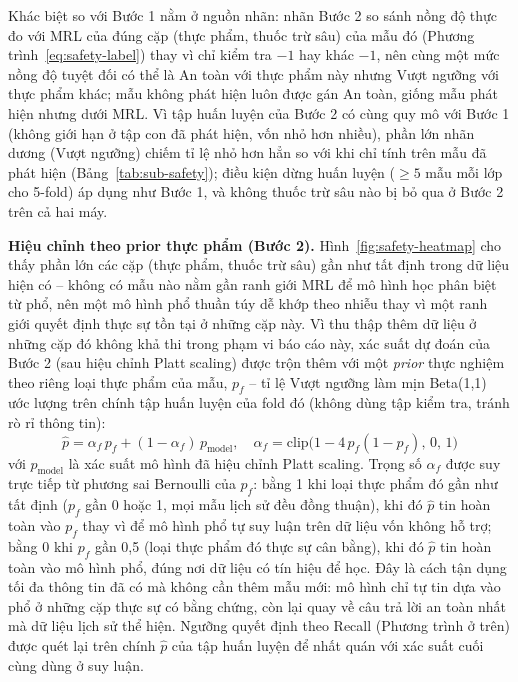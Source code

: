 \documentclass[10pt,twocolumn,twoside]{article}
\begin{document}
Khác biệt so với Bước 1 nằm ở nguồn nhãn: nhãn Bước 2 so sánh nồng độ thực
đo với MRL của đúng cặp (thực phẩm, thuốc trừ sâu) của mẫu đó (Phương
trình~\ref{eq:safety-label}) thay vì chỉ kiểm tra $-1$ hay khác $-1$, nên
cùng một mức nồng độ tuyệt đối có thể là An toàn với thực phẩm này nhưng
Vượt ngưỡng với thực phẩm khác; mẫu không phát hiện luôn được gán An toàn,
giống mẫu phát hiện nhưng dưới MRL. Vì tập huấn luyện của Bước 2 có cùng quy
mô với Bước 1 (không giới hạn ở tập con đã phát hiện, vốn nhỏ hơn nhiều),
phần lớn nhãn dương (Vượt ngưỡng) chiếm tỉ lệ nhỏ hơn hẳn so với khi chỉ
tính trên mẫu đã phát hiện (Bảng~\ref{tab:sub-safety}); điều kiện dừng huấn
luyện ($\geq 5$ mẫu mỗi lớp cho 5-fold) áp dụng như Bước 1, và không thuốc
trừ sâu nào bị bỏ qua ở Bước 2 trên cả hai máy.

\textbf{Hiệu chỉnh theo prior thực phẩm (Bước 2).} Hình~\ref{fig:safety-heatmap}
cho thấy phần lớn các cặp (thực phẩm, thuốc trừ sâu) gần như tất định trong
dữ liệu hiện có -- không có mẫu nào nằm gần ranh giới MRL để mô hình học
phân biệt từ phổ, nên một mô hình phổ thuần túy dễ khớp theo nhiễu thay vì
một ranh giới quyết định thực sự tồn tại ở những cặp này. Vì thu thập thêm
dữ liệu ở những cặp đó không khả thi trong phạm vi báo cáo này, xác suất dự
đoán của Bước 2 (sau hiệu chỉnh Platt scaling) được trộn thêm với một
\emph{prior} thực nghiệm theo riêng loại thực phẩm của mẫu, $p_f$ -- tỉ lệ
Vượt ngưỡng làm mịn Beta(1,1) ước lượng trên chính tập huấn luyện của fold
đó (không dùng tập kiểm tra, tránh rò rỉ thông tin):
\begin{equation}
\hat{p} = \alpha_f\, p_f + (1-\alpha_f)\, p_{\text{model}}, \quad
\alpha_f = \mathrm{clip}\big(1 - 4\,p_f(1-p_f),\, 0,\, 1\big)
\label{eq:food-shrinkage}
\end{equation}
với $p_{\text{model}}$ là xác suất mô hình đã hiệu chỉnh Platt scaling.
Trọng số $\alpha_f$ được suy trực tiếp từ phương sai Bernoulli của $p_f$:
bằng 1 khi loại thực phẩm đó gần như tất định ($p_f$ gần 0 hoặc 1, mọi mẫu
lịch sử đều đồng thuận), khi đó $\hat p$ tin hoàn toàn vào $p_f$ thay vì để
mô hình phổ tự suy luận trên dữ liệu vốn không hỗ trợ; bằng 0 khi $p_f$ gần
0,5 (loại thực phẩm đó thực sự cân bằng), khi đó $\hat p$ tin hoàn toàn vào
mô hình phổ, đúng nơi dữ liệu có tín hiệu để học. Đây là cách tận dụng tối
đa thông tin đã có mà không cần thêm mẫu mới: mô hình chỉ tự tin dựa vào
phổ ở những cặp thực sự có bằng chứng, còn lại quay về câu trả lời an toàn
nhất mà dữ liệu lịch sử thể hiện. Ngưỡng quyết định theo Recall
(Phương trình ở trên) được quét lại trên chính $\hat p$ của tập huấn luyện
để nhất quán với xác suất cuối cùng dùng ở suy luận.
\end{document}

